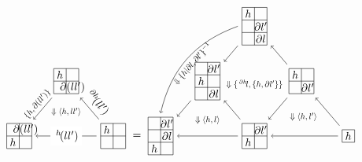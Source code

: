 \documentclass[11pt, reqno]{amsart} %
\newcommand{\act}[1]{\,\sp{#1}\!}
\newcommand{\strrect}[3][]{
  \begin{scope}[every node/.append style={overlay},#1]
    \foreach \x [count=\i] in {#3}{
      \ifx\x\empty
      \else
        \pgfmathsetmacro{\modResult}{mod(\i-1, #2)}
        \pgfmathsetmacro{\quotResult}{(\i-\modResult-1)/#2}
        \node at (\modResult,-\quotResult) {\x};
      \fi
    }
    \foreach \x in {0,1,...,#2}{
      \draw ({-1/2+\x},{1/2})--({-1/2+\x},{-#2+1/2});
      \draw ({-1/2},{1/2-\x})--({#2-1/2},{1/2-\x});
    }
  \end{scope}
}
\newcommand{\strsquare}[4][]{
  \begin{scope}[every node/.append style={overlay},#1]
    \foreach \x [count=\i] in {#4}{
      \ifx\x\empty
      \else
        \pgfmathsetmacro{\modResult}{mod(\i-1, #2)}
        \pgfmathsetmacro{\quotResult}{(\i-\modResult-1)/#2}
        \node at (\modResult,-\quotResult) {\x};
      \fi
    }
    \foreach \x in {0,1,...,#2}{
      \draw ({-1/2+\x},{1/2})--({-1/2+\x},{-#3+1/2});
    }
    \foreach \y in {0,1,...,#3}{
      \draw ({-1/2},{1/2-\y})--({#2-1/2},{1/2-\y});
    }
  \end{scope}
}
\theoremstyle{definition}
\theoremstyle{remark}
\numberwithin{equation}{section}
\begin{document}
\begin{align*}
  \begin{tikzpicture}[baseline=-2pt]
    \node (A) at (1.5,0) {\tikz[baseline=-2pt,scale=.4]{\strrect{2}{$h$,,,}}};
    \node (B) at (0,1.75) {\tikz[baseline=-2pt,scale=.4]{\strrect{2}{$h$,,,$\partial (ll')$}}};
    \node (C) at (-1.5,0) {\tikz[baseline=-2pt,scale=.4]{\strrect{2}{,$\partial (ll')$,$h$,}}};
    \draw [->] (A) to node [anchor=south,sloped] {$\act{\partial h}(ll')$} (B);
    \draw [->] (B) to node [anchor=south,sloped,transform shape,scale=.75] {$\{h,\partial (ll')\}$} (C);
    \draw [->] (A) to node [fill=white] (D) {$\act{h}(ll')$} (C);
    \path (B) to node [transform shape,scale=.75] {$\Downarrow \left<h,ll'\right>$} (D);
  \end{tikzpicture}
  =
  \begin{tikzpicture}[baseline=-2pt]
    \node (A) at (3,0) {\tikz[baseline=-2pt,scale=.4]{\strrect{1}{$h$}}};
    \node (B) at (1.5,1.75) {\tikz[baseline=-2pt,scale=.4]{\strrect{2}{$h$,,,$\partial l'$}}};
    \node (C1) at (0,3.5) {\tikz[baseline=-2pt,scale=.4]{\strsquare{2}{3}{$h$,,,$\partial l'$,,$\partial l$}}};
    \node (C2) at (0,0) {\tikz[baseline=-2pt,scale=.4]{\strrect{2}{,$\partial l'$,$h$,}}};
    \node (D) at (-1.5,1.75) {\tikz[baseline=-2pt,scale=.4]{\strsquare{2}{3}{,$\partial l'$,$h$,,,$\partial l$}}};
    \node (E) at (-3,0) {\tikz[baseline=-2pt,scale=.4]{\strsquare{2}{3}{,$\partial l'$,,$\partial l$,$h$,}}};
    \draw [->] (A) to (B);
    \draw [->] (B) to (C1);
    \draw [->] (C1) to (D);
    \draw [->] (D) to (E);
    \draw [->] (A) to coordinate (F1) (C2);
    \draw [->] (C2) to coordinate (F2) (E);
    \draw [->] (B) to (C2);
    \draw [->] (C2) to (D);
    \draw [->,bend right=1cm] (C1.west) to node [transform shape,scale=.75,sloped,anchor=north] {$\Downarrow \{h|\partial l,\partial l'\}^{-1}$} (E.north);
    \path (C1) to node [transform shape,scale=.75] {$\Downarrow \{\act{\partial h}l,\{h,\partial l'\}\}$} (C2);
    \path (B) to node [transform shape,scale=.75] {$\Downarrow \left<h,l'\right>$} (F1);
    \path (D) to node [transform shape,scale=.75] {$\Downarrow \left<h,l\right>$} (F2);
  \end{tikzpicture}
\end{align*}
\end{document}
